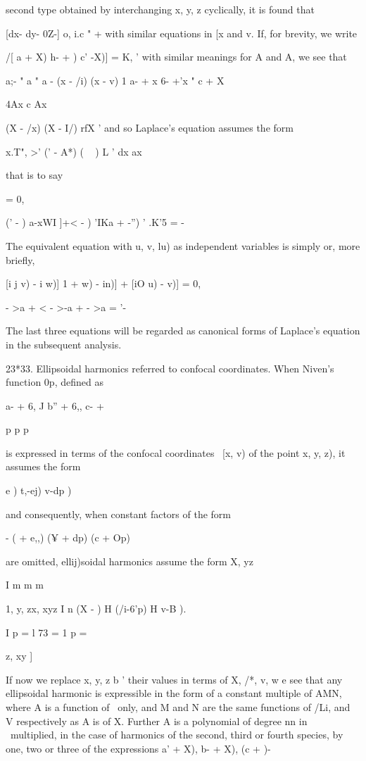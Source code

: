 {{{second type obtained by interchanging x, y, z cyclically, it is found
that

[dx- dy- 0Z-] o, i.c " + with similar equations in [x and v. If, for
brevity, we write

 /[ a + X) h- + ) c' -X)] = K, ' with similar meanings for A and A,
we see that

a;- " a " a - (x - /i) (x - v) 1 a- + x 6- +'x " c + X

4Ax c Ax

(X - /x) (X - I/) rfX ' and so Laplace's equation assumes the form

x.T", >' (' - A*) ( ~ ) L ' dx ax

that is to say

= 0,

(' - ) a-xWI ]+< - ) 'IKa + -'') ' .K'5 = -

The equivalent equation with u, v, lu) as independent variables is
simply or, more briefly,

[i j v) - i w)] 1 + w) - in)] + [iO u) - v)] = 0,

 - >a + < - >-a + - >a = '-

The last three equations will be regarded as canonical forms of
Laplace's equation in the subsequent analysis.

23*33. Ellipsoidal harmonics referred to confocal coordinates. When
Niven's function 0p, defined as

a- + 6, J b'' + 6,, c- +

p p p

%
%

is expressed in terms of the confocal coordinates \ [x, v) of the
point x, y, z), it assumes the form

  e ) t,-ej) v-dp )

and consequently, when constant factors of the form

- ( + e,,) (¥ + dp) (c + Op)

are omitted, ellij)soidal harmonics assume the form X, yz \

I m m m

1, y, zx, xyz I n (X - ) H (/i-6'p) H v-B ).

I p = l 73 = 1 p = \

z, xy ]

If now we replace x, y, z b ' their values in terms of X, /*, v, w e
see that any ellipsoidal harmonic is expressible in the form of a
constant multiple of AMN, where A is a function of \ only, and M and N
are the same functions of /Li, and V respectively as A is of X.
Further A is a polynomial of degree nn in \ multiplied, in the case of
harmonics of the second, third or fourth species, by one, two or three
of the expressions \/ a' + X), \/ b- + X), \/(c + )-

}}}
